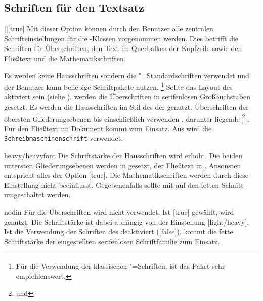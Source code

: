 \subsection{Schriften für den Textsatz}
\begin{Declaration}{[\PSet]}[true]%
\printdeclarationlist%
\label{sec:text}%
%
%
Mit dieser Option können durch den Benutzer alle zentralen Schrifteinstellungen 
für die \TUDScript-Klassen vorgenommen werden. Dies betrifft die Schriften für 
Überschriften, den Text im Querbalken der Kopfzeile sowie den Fließtext und die 
Mathematikschriften.
%
\begin{values}
\itemfalse
  Es werden keine Hausschriften sondern die "=Standardschriften 
  verwendet und der Benutzer kann beliebige Schriftpakete nutzen.%
  \footnote{%
    Für die Verwendung der klassischen "=Schriften, ist das Paket 
     sehr empfehlenswert.%
  }
  Sollte das Layout des \CDs aktiviert sein (siehe ), werden die 
  Überschriften in serifenlosen Großbuchstaben gesetzt.
  Es werden die Hausschriften im Stil des \CDs der \TnUD genutzt. Überschriften 
  der obersten Gliederungsebenen bis einschließlich  
  verwenden \DIN, darunter liegende%
  \footnote{ und } 
  . Für den Fließtext im Dokument kommt 
   zum Einsatz. Aus  wird die
  \texttt{Schreibmaschinenschrift} verwendet.
\item[heavy/heavyfont]
  Die Schriftstärke der Hausschriften wird erhöht. Die beiden untersten 
  Gliederungsebenen werden in  gesetzt, der Fließtext 
  in . Ansonsten entspricht alles der Option 
  [true]. Die Mathematikschriften werden durch diese 
  Einstellung nicht beeinflusst. Gegebenenfalls sollte mit  auf 
  den fetten Schnitt umgeschaltet werden.
\item[nodin]
  Für die Überschriften wird nicht \DIN verwendet. Ist [true] 
  gewählt, wird \Univers genutzt. Die Schriftstärke ist dabei abhängig von der 
  Einstellung [light/heavy]. Ist die Verwendung der Schriften 
  des \CDs deaktiviert ([false]), kommt die fette Schriftstärke 
  der eingestellten serifenlosen Schriftfamilie zum Einsatz.

\end{values}
\end{Declaration}
